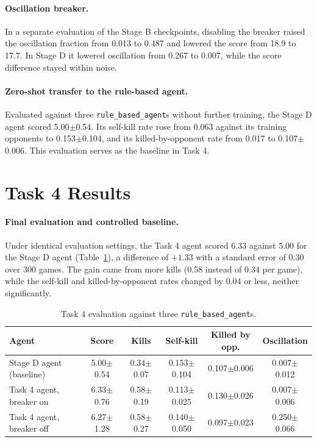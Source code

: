 \documentclass[11pt,a4paper]{report}
\begin{document}
	\paragraph{Oscillation breaker.} In a separate evaluation of the Stage B checkpoints, disabling the breaker raised the oscillation fraction from 0.013 to 0.487 and lowered the score from 18.9 to 17.7. In Stage D it lowered oscillation from 0.267 to 0.007, while the score difference stayed within noise.
	
	\paragraph{Zero-shot transfer to the rule-based agent.} Evaluated against three \texttt{rule\_based\_agent}s without further training, the Stage D agent scored 5.00$\pm$0.54. Its self-kill rate rose from 0.063 against its training opponents to 0.153$\pm$0.104, and its killed-by-opponent rate from 0.017 to 0.107$\pm$0.006. This evaluation serves as the baseline in Task 4.
	
	\section{Task 4 Results}
	\label{subsec:rhine_results_task4}
	
	\paragraph{Final evaluation and controlled baseline.} Under identical evaluation settings, the Task 4 agent scored 6.33 against 5.00 for the Stage D agent (Table~\ref{tab:rhine_task4}), a difference of $+1.33$ with a standard error of 0.30 over 300 games. The gain came from more kills (0.58 instead of 0.34 per game), while the self-kill and killed-by-opponent rates changed by 0.04 or less, neither significantly.
	
	\begin{table}[H]
		\centering
		\small
		\begin{tabular}{lccccc}
			\toprule
			Agent & Score & Kills & Self-kill & Killed by opp. & Oscillation \\
			\midrule
			Stage D agent (baseline) & 5.00$\pm$0.54 & 0.34$\pm$0.07 & 0.153$\pm$0.104 & 0.107$\pm$0.006 & 0.007$\pm$0.012 \\
			Task 4 agent, breaker on & 6.33$\pm$0.76 & 0.58$\pm$0.19 & 0.113$\pm$0.025 & 0.130$\pm$0.026 & 0.007$\pm$0.006 \\
			Task 4 agent, breaker off & 6.27$\pm$1.28 & 0.58$\pm$0.27 & 0.140$\pm$0.050 & 0.097$\pm$0.023 & 0.250$\pm$0.066 \\
			\bottomrule
		\end{tabular}
		\caption{Task 4 evaluation against three \texttt{rule\_based\_agent}s.}
		\label{tab:rhine_task4}
	\end{table}
	
\end{document}
